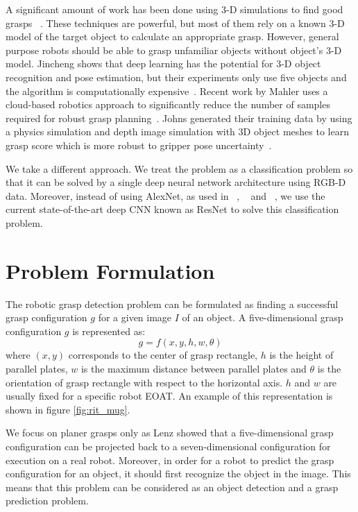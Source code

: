 \documentclass[10pt,twocolumn,letterpaper]{article}
\begin{document}
A significant amount of work has been done using 3-D simulations to find good grasps ~\cite{bohg2010learning,krainin2011autonomous,5509508,5649406}. These techniques are powerful, but most of them rely on a known 3-D model of the target object to calculate an appropriate grasp. However, general purpose robots should be able to grasp unfamiliar objects without object's 3-D model. Jincheng \etal shows that deep learning has the potential for 3-D object recognition and pose estimation, but their experiments only use five objects and the algorithm is computationally expensive~\cite{yu2013vision}. Recent work by Mahler \etal uses a cloud-based robotics approach to significantly reduce the number of samples required for robust grasp planning~\cite{7487342}. Johns \etal generated their training data by using a physics simulation and depth image simulation with 3D object meshes to learn grasp score which is more robust to gripper pose uncertainty~\cite{johns2016deep}.

We take a different approach. We treat the problem as a classification problem so that it can be solved by a single deep neural network architecture using RGB-D data. Moreover, instead of using AlexNet, as used in ~\cite{lenz2015deep}, ~\cite{7487517} and ~\cite{Redmon}, we use the current state-of-the-art deep CNN known as ResNet to solve this classification problem.




\section{Problem Formulation}
The robotic grasp detection problem can be formulated as finding a successful grasp configuration $g$ for a given image $I$ of an object. A five-dimensional grasp configuration $g$ is represented as:
\begin{equation}
g = f(x, y, h, w, \theta)
\end{equation}
where $(x,y)$ corresponds to the center of grasp rectangle, $h$ is the height of parallel plates, $w$ is the maximum distance between parallel plates and $\theta$ is the orientation of grasp rectangle with respect to the horizontal axis. $h$ and $w$ are usually fixed for a specific robot EOAT. An example of this representation is shown in figure \ref{fig:rit_mug}. 

We focus on planer grasps only as Lenz \etal showed that a five-dimensional grasp configuration can be projected back to a seven-dimensional configuration for execution on a real robot. Moreover, in order for a robot to predict the grasp configuration for an object, it should first recognize the object in the image. This means that this problem can be considered as an object detection and a grasp prediction problem.
\end{document}
